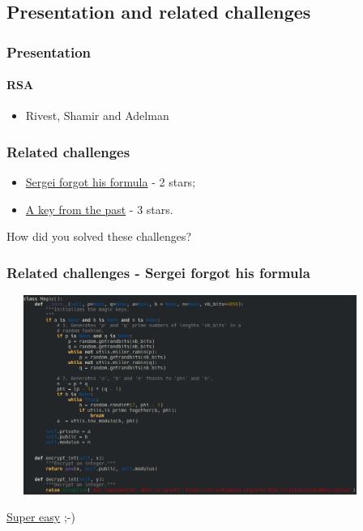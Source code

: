 \documentclass[]{beamer}
\begin{document}
\subsection{Presentation and related challenges}
\begin{frame}
\frametitle{Presentation}
\framesubtitle{RSA}
\begin{itemize}
    \item Rivest, Shamir and Adelman
\end{itemize}
\end{frame}

\begin{frame}
\frametitle{Related challenges}
\begin{itemize}
    \item \href{https://github.com/cscluxembourg/vestatech/blob/master/challenges/Sergei_forgot_his_formula/wip.py}{Sergei forgot his formula} - 2 stars;
    \item \href{https://github.com/cscluxembourg/vestatech/tree/master/challenges/A_key_from_the_past}{A key from the past} - 3 stars.
\end{itemize}
\bigskip
How did you solved these challenges?
\end{frame}

\begin{frame}
\frametitle{Related challenges - Sergei forgot his formula}
\begin{center}
    \includegraphics[height=6.5cm, width=12.0cm]{./images/RSA-algo-key-generation.png}
\end{center}
\href{https://en.wikipedia.org/wiki/RSA_(cryptosystem)\#Decryption}{Super easy} ;-)
\end{frame}
\end{document}
